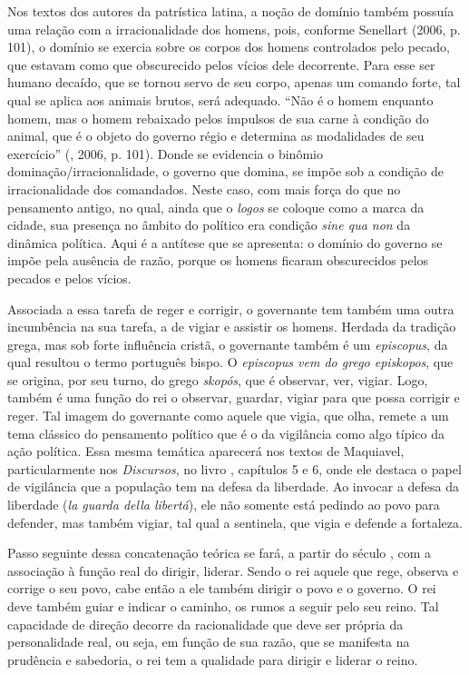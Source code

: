 Nos textos dos autores da patrística latina, a noção de domínio também
possuía uma relação com a irracionalidade dos homens, pois, conforme
Senellart (2006, p. 101), o domínio se exercia sobre os corpos dos
homens controlados pelo pecado, que estavam como que obscurecido pelos
vícios dele decorrente. Para esse ser humano decaído, que se tornou
servo de seu corpo, apenas um comando forte, tal qual se aplica aos
animais brutos, será adequado. ``Não é o homem enquanto homem, mas o
homem rebaixado pelos impulsos de sua carne à condição do animal, que é
o objeto do governo régio e determina as modalidades de seu exercício''
(, 2006, p. 101). Donde se evidencia o binômio
dominação/irracionalidade, o governo que domina, se impõe sob a condição
de irracionalidade dos comandados. Neste caso, com mais força do que no
pensamento antigo, no qual, ainda que o \emph{logos} se coloque como a
marca da cidade, sua presença no âmbito do político era condição
\emph{sine qua non} da dinâmica política. Aqui é a antítese que se
apresenta: o domínio do governo se impõe pela ausência de razão, porque
os homens ficaram obscurecidos pelos pecados e pelos vícios.

Associada a essa tarefa de reger e corrigir, o governante tem também uma
outra incumbência na sua tarefa, a de vigiar e assistir os homens.
Herdada da tradição grega, mas sob forte influência cristã, o governante
também é um \emph{episcopus}, da qual resultou o termo português bispo.
O \emph{episcopus vem do grego episkopos}, que se origina, por seu
turno, do grego \emph{skopós}, que é observar, ver, vigiar. Logo, também
é uma função do rei o observar, guardar, vigiar para que possa corrigir
e reger. Tal imagem do governante como aquele que vigia, que olha,
remete a um tema clássico do pensamento político que é o da vigilância
como algo típico da ação política. Essa mesma temática aparecerá nos
textos de Maquiavel, particularmente nos \emph{Discursos}, no livro ,
capítulos 5 e 6, onde ele destaca o papel de vigilância que a população
tem na defesa da liberdade. Ao invocar a defesa da liberdade (\emph{la
guarda della libertá}), ele não somente está pedindo ao povo para
defender, mas também vigiar, tal qual a sentinela, que vigia e defende a
fortaleza.

Passo seguinte dessa concatenação teórica se fará, a partir do século
, com a associação à função real do dirigir, liderar. Sendo o rei
aquele que rege, observa e corrige o seu povo, cabe então a ele também
dirigir o povo e o governo. O rei deve também guiar e indicar o caminho,
os rumos a seguir pelo seu reino. Tal capacidade de direção decorre da
racionalidade que deve ser própria da personalidade real, ou seja, em
função de sua razão, que se manifesta na prudência e sabedoria, o rei
tem a qualidade para dirigir e liderar o reino.

